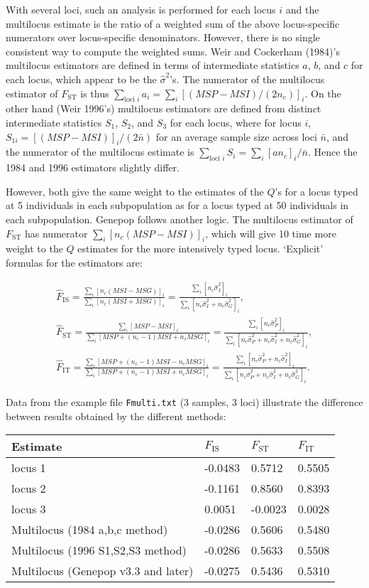 \documentclass[12pt,]{book}
\theoremstyle{definition}
\theoremstyle{definition}
\theoremstyle{definition}
\theoremstyle{remark}
\begin{document}
With several loci, such an analysis is performed for each locus \(i\)
and the multilocus estimate is the ratio of a weighted sum of the above
locus-specific numerators over locus-specific denominators. However,
there is no single consistent way to compute the weighted sums. Weir and
Cockerham (1984)'s multilocus estimators are defined in terms of
intermediate statistics \(a\), \(b\), and \(c\) for each locus, which
appear to be the \(\hat{\sigma}^2\)'s. The numerator of the multilocus
estimator of \(F_\mathrm{ST}\) is thus
\(\sum_{\textrm{loci }i}a_i=\sum_{i}[(MSP-MSI)/(2n_c)]_i\). On the other
hand (Weir 1996's) multilocus estimators are defined from distinct
intermediate statistics \(S_1\), \(S_2\), and \(S_3\) for each locus,
where for locus \(i\), \(S_{1i}=[(MSP-MSI)]_i/(2\bar{n})\) for an
average sample size across loci \(\bar{n}\), and the numerator of the
multilocus estimate is
\(\sum_{\textrm{loci }i}S_i=\sum_{i}[a n_c]_i/\bar{n}\). Hence the 1984
and 1996 estimators slightly differ.

However, both give the same weight to the estimates of the \(Q\)'s for a
locus typed at 5 individuals in each subpopulation as for a locus typed
at 50 individuals in each subpopulation. Genepop follows another logic.
The multilocus estimator of \(F_\mathrm{ST}\) has numerator
\(\sum_i [n_c(MSP-MSI)]_i\), which will give 10 time more weight to the
\(Q\) estimates for the more intensively typed locus. `Explicit'
formulas for the estimators are:

\[\begin{gathered}
    \hat{F}_{\mathrm{IS}}=    \frac{\sum_i [n_c(MSI-MSG)]_i}{\sum_i [n_c(MSI+MSG)]_i}=
    \frac{\sum_i [n_c\hat{\sigma}^2_I]_i}{\sum_i [n_c\hat{\sigma}^2_I+n_c\hat{\sigma}^2_G]_i}, \\
        \hat{F}_{\mathrm{ST}}=    \frac{\sum_i [MSP-MSI]_i}{\sum_i [MSP+(n_c-1)MSI+n_cMSG]_i}=
    \frac{\sum_i [n_c\hat{\sigma}^2_P]_i}{\sum_i [n_c\hat{\sigma}^2_P+n_c\hat{\sigma}^2_I+n_c\hat{\sigma}^2_G]_i}, \\
        \hat{F}_{\mathrm{IT}}=    \frac{\sum_i [MSP+(n_c-1)MSI-n_cMSG]_i}{\sum_i [MSP+(n_c-1)MSI+n_cMSG]_i}=
    \frac{\sum_i [n_c\hat{\sigma}^2_P+n_c\hat{\sigma}^2_I]_i}{\sum_i [n_c\hat{\sigma}^2_P+n_c\hat{\sigma}^2_I+n_c\hat{\sigma}^2_G]_i}.\end{gathered}\]

Data from the example file \texttt{Fmulti.txt} (3 samples, 3 loci)
illustrate the difference between results obtained by the different
methods:

\begin{longtable}[]{@{}llll@{}}
\toprule
Estimate & \(F_\mathrm{IS}\) & \(F_\mathrm{ST}\) &
\(F_\mathrm{IT}\)\tabularnewline
\midrule
\endhead
locus 1 & -0.0483 & 0.5712 & 0.5505\tabularnewline
locus 2 & -0.1161 & 0.8560 & 0.8393\tabularnewline
locus 3 & 0.0051 & -0.0023 & 0.0028\tabularnewline
Multilocus (1984 a,b,c method) & -0.0286 & 0.5606 &
0.5480\tabularnewline
Multilocus (1996 S1,S2,S3 method) & -0.0286 & 0.5633 &
0.5508\tabularnewline
Multilocus (Genepop v3.3 and later) & -0.0275 & 0.5436 &
0.5310\tabularnewline
\bottomrule
\end{longtable}
\end{document}
